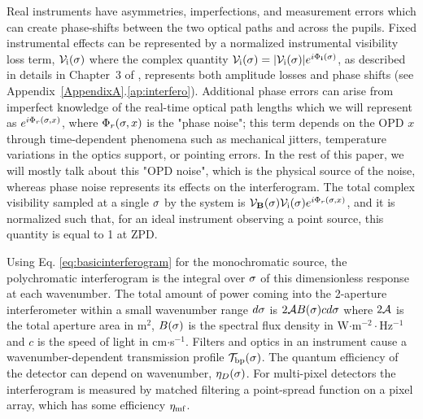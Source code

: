 
Real instruments have asymmetries, imperfections, and measurement errors which can create phase-shifts between the two optical paths and across the pupils.
Fixed instrumental effects 
can be represented by a normalized instrumental visibility loss term, 
$\mathcal{V}_\textrm{i}(\sigma)$ where the complex quantity $\mathcal{V}_\textrm{i}(\sigma) = |\mathcal{V}_\textrm{i}(\sigma)|e^{i\Phi_\mathbf{i}(\sigma)}$, as described in details in Chapter~3 of \citep{Lawson:2000vf}, represents both amplitude losses and phase shifts (see Appendix~\ref{AppendixA}.\ref{ap:interfero}). Additional phase errors can arise from
imperfect knowledge of the real-time optical path lengths which we will represent as
$e^{i\Phi_r(\sigma, x)}$, where $\Phi_r(\sigma, x)$ is the "phase noise"; this term depends on the OPD $x$ through time-dependent phenomena such as mechanical jitters, temperature variations in
the optics support, or pointing errors. In the rest of this paper, we will mostly talk about this "OPD noise", which is the physical source of the noise, whereas phase noise represents its effects on the interferogram.
The total complex visibility sampled at a single $\sigma$ by the system is $\mathcal{V}_{\mathbf{B}}(\sigma)\mathcal{V}_\textrm{i}(\sigma) e^{i\Phi_r(\sigma, x)}$, and it is normalized such that, for an ideal instrument observing a point source, this quantity is equal to 1 at ZPD.

Using Eq. \ref{eq:basicinterferogram} for the monochromatic source, the polychromatic interferogram is the integral over $\sigma$ of this dimensionless response at each wavenumber. The total amount of power coming into the 2-aperture interferometer within a small wavenumber range $d\sigma$ is $2\mathcal{A} B(\sigma) c d\sigma$ where $2\mathcal{A}$ is the total aperture area in m$^2$, $B(\sigma)$ is the spectral flux density in W$\cdot$m$^{-2}\cdot$Hz$^{-1}$ and $c$ is the speed of light in cm$\cdot$s$^{-1}$. 
Filters and optics in an instrument cause a wavenumber-dependent transmission profile $\mathcal{T}_\textrm{bp}(\sigma)$. The quantum efficiency of the detector can depend on wavenumber, $\eta_D(\sigma)$. For multi-pixel detectors the interferogram is measured by matched filtering a point-spread function on a pixel array, which has some efficiency $\eta_\textrm{mf}$.%

